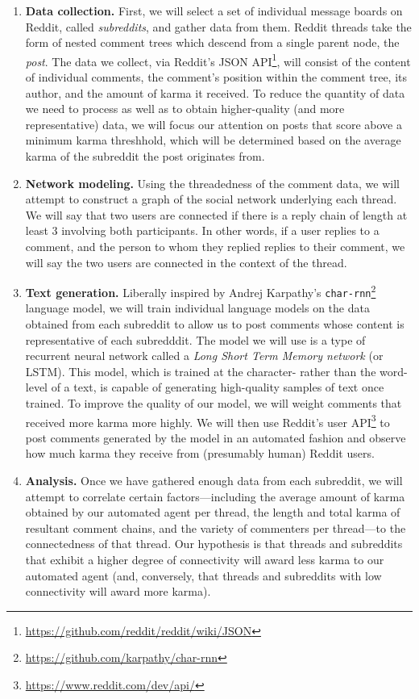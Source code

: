 \documentclass[12pt]{article}
\begin{document}
    \begin{enumerate}
        \item \textbf{Data collection.} First, we will select a set of individual message boards on Reddit, called \textit{subreddits}, and gather data from them. Reddit threads take the form of nested comment trees which descend from a single parent node, the \textit{post}. The data we collect, via Reddit's JSON API\footnote{\url{https://github.com/reddit/reddit/wiki/JSON}}, will consist of the content of individual comments, the comment's position within the comment tree, its author, and the amount of karma it received. To reduce the quantity of data we need to process as well as to obtain higher-quality (and more representative) data, we will focus our attention on posts that score above a minimum karma threshhold, which will be determined based on the average karma of the subreddit the post originates from.
        \item \textbf{Network modeling.} Using the threadedness of the comment data, we will attempt to construct a graph of the social network underlying each thread. We will say that two users are connected if there is a reply chain of length at least 3 involving both participants. In other words, if a user replies to a comment, and the person to whom they replied replies to their comment, we will say the two users are connected in the context of the thread.
        \item \textbf{Text generation.} Liberally inspired by Andrej Karpathy's \texttt{char-rnn}\footnote{\url{https://github.com/karpathy/char-rnn}} language model, we will train individual language models on the data obtained from each subreddit to allow us to post comments whose content is representative of each subredddit. The model we will use is a type of recurrent neural network called a \textit{Long Short Term Memory network} (or LSTM). This model, which is trained at the character- rather than the word-level of a text, is capable of generating high-quality samples of text once trained. To improve the quality of our model, we will weight comments that received more karma more highly. We will then use Reddit's user API\footnote{\url{https://www.reddit.com/dev/api/}} to post comments generated by the model in an automated fashion and observe how much karma they receive from (presumably human) Reddit users.
        \item \textbf{Analysis.} Once we have gathered enough data from each subreddit, we will attempt to correlate certain factors---including the average amount of karma obtained by our automated agent per thread, the length and total karma of resultant comment chains, and the variety of commenters per thread---to the connectedness of that thread. Our hypothesis is that threads and subreddits that exhibit a higher degree of connectivity will award less karma to our automated agent (and, conversely, that threads and subreddits with low connectivity will award more karma).
    \end{enumerate}
\end{document}

